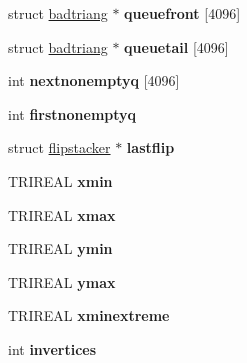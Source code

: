 \begin{DoxyCompactItemize}
\item 
\hypertarget{structmesh_a9fb6633c391887f9ece4f47c6251d806}{
struct \hyperlink{structbadtriang}{badtriang} $\ast$ {\bfseries queuefront} \mbox{[}4096\mbox{]}}
\label{structmesh_a9fb6633c391887f9ece4f47c6251d806}

\item 
\hypertarget{structmesh_a194e9c6cc034fe96c3eb3d6660e0d5d7}{
struct \hyperlink{structbadtriang}{badtriang} $\ast$ {\bfseries queuetail} \mbox{[}4096\mbox{]}}
\label{structmesh_a194e9c6cc034fe96c3eb3d6660e0d5d7}

\item 
\hypertarget{structmesh_a67dae9c18940347bff87ac492258acb5}{
int {\bfseries nextnonemptyq} \mbox{[}4096\mbox{]}}
\label{structmesh_a67dae9c18940347bff87ac492258acb5}

\item 
\hypertarget{structmesh_a420eac8320d421bf6ba4d68daef14107}{
int {\bfseries firstnonemptyq}}
\label{structmesh_a420eac8320d421bf6ba4d68daef14107}

\item 
\hypertarget{structmesh_a8a82d7821fd526fb8f406be1ece5b591}{
struct \hyperlink{structflipstacker}{flipstacker} $\ast$ {\bfseries lastflip}}
\label{structmesh_a8a82d7821fd526fb8f406be1ece5b591}

\item 
\hypertarget{structmesh_a69d1ecb3863a6a57919c1d7ac9251e21}{
TRIREAL {\bfseries xmin}}
\label{structmesh_a69d1ecb3863a6a57919c1d7ac9251e21}

\item 
\hypertarget{structmesh_a555362201efc9549764ec7f6a22b6095}{
TRIREAL {\bfseries xmax}}
\label{structmesh_a555362201efc9549764ec7f6a22b6095}

\item 
\hypertarget{structmesh_af999aedf5ee3137470c19dda98699ac7}{
TRIREAL {\bfseries ymin}}
\label{structmesh_af999aedf5ee3137470c19dda98699ac7}

\item 
\hypertarget{structmesh_ab887f178cdfb697b6b0ba1579ba5970a}{
TRIREAL {\bfseries ymax}}
\label{structmesh_ab887f178cdfb697b6b0ba1579ba5970a}

\item 
\hypertarget{structmesh_a569331804585352e603ac2f346a3cea6}{
TRIREAL {\bfseries xminextreme}}
\label{structmesh_a569331804585352e603ac2f346a3cea6}

\item 
\hypertarget{structmesh_a35525eea6ffd1d5614056308a7530666}{
int {\bfseries invertices}}
\label{structmesh_a35525eea6ffd1d5614056308a7530666}


\end{DoxyCompactItemize}

